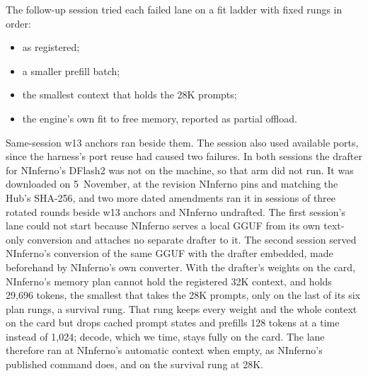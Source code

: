 \documentclass[11pt,letterpaper]{article}
\begin{document}
The follow-up session tried each failed lane on a fit ladder with fixed rungs in
order:
\begin{itemize}\setlength{\itemsep}{1pt}
\item as registered;
\item a smaller prefill batch;
\item the smallest context that holds the 28K prompts;
\item the engine's own fit to free memory, reported as partial offload.
\end{itemize}
Same-session w13 anchors ran beside them. The session also used available ports, since the harness's port reuse had
caused two failures. In
both sessions the drafter for NInferno's DFlash2 was not on the machine, so
that arm did not run. It was downloaded on 5~November, at the revision
NInferno pins and matching the Hub's SHA-256, and two more dated amendments
ran it in sessions of three rotated rounds beside w13 anchors and NInferno
undrafted. The first session's lane could not start because NInferno serves a local
GGUF from its own text-only conversion and attaches no separate drafter to
it. The second session served NInferno's conversion of the same GGUF with the
drafter embedded, made beforehand by NInferno's own converter. With the
drafter's weights on the card, NInferno's memory plan cannot hold the
registered 32K context, and holds 29,696 tokens, the smallest that takes the
28K prompts, only on the last of its six plan rungs, a survival rung. That
rung keeps every weight and the whole context on the card but drops cached
prompt states and prefills 128 tokens at a time instead of 1,024; decode,
which we time, stays fully on the card. The lane therefore ran at NInferno's
automatic context when empty, as NInferno's published command does, and on
the survival rung at 28K.
\end{document}
